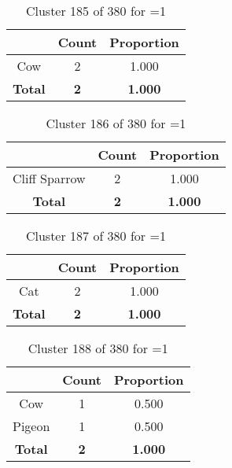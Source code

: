 \begin{table}[ht!]
\centering
\begin{tabular}{|c|c|c|}
\hline
\bf \Spec{} &\bf Count &\bf Proportion\\ \hline \hline
Cow & 2 & 1.000\\ \hline
\hline
\bf Total & \bf 2 & \bf 1.000\\ \hline
\end{tabular}
\label{tab:cluster:185:1}
\caption{Cluster 185 of 380 for \minneigh{}=1}
\end{table}

\begin{table}[ht!]
\centering
\begin{tabular}{|c|c|c|}
\hline
\bf \Spec{} &\bf Count &\bf Proportion\\ \hline \hline
Cliff Sparrow & 2 & 1.000\\ \hline
\hline
\bf Total & \bf 2 & \bf 1.000\\ \hline
\end{tabular}
\label{tab:cluster:186:1}
\caption{Cluster 186 of 380 for \minneigh{}=1}
\end{table}

\begin{table}[ht!]
\centering
\begin{tabular}{|c|c|c|}
\hline
\bf \Spec{} &\bf Count &\bf Proportion\\ \hline \hline
Cat & 2 & 1.000\\ \hline
\hline
\bf Total & \bf 2 & \bf 1.000\\ \hline
\end{tabular}
\label{tab:cluster:187:1}
\caption{Cluster 187 of 380 for \minneigh{}=1}
\end{table}

\begin{table}[ht!]
\centering
\begin{tabular}{|c|c|c|}
\hline
\bf \Spec{} &\bf Count &\bf Proportion\\ \hline \hline
Cow & 1 & 0.500\\ \hline
Pigeon & 1 & 0.500\\ \hline
\hline
\bf Total & \bf 2 & \bf 1.000\\ \hline
\end{tabular}
\label{tab:cluster:188:1}
\caption{Cluster 188 of 380 for \minneigh{}=1}
\end{table}


